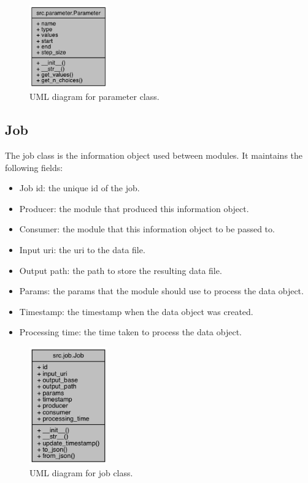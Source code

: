\documentclass{article}
\begin{document}
    \begin{figure}[H]
        \begin{center}
            \includegraphics[width=0.3\textwidth]{fig/param_uml.png}
        \end{center}
        \label{fig:param_uml}
        \caption{UML diagram for parameter class.}
    \end{figure}

    \subsection{Job}
    \label{sec:job}
    The job class is the information object used between modules.
    It maintains the following fields:

    \begin{itemize}
        \item Job id: the unique id of the job.
        \item Producer: the module that produced this information object.
        \item Consumer: the module that this information object to be passed to.
        \item Input uri: the uri to the data file.
        \item Output path: the path to store the resulting data file.
        \item Params: the params that the module should use to process the data object.
        \item Timestamp: the timestamp when the data object was created.
        \item Processing time: the time taken to process the data object.
    \end{itemize}


    \begin{figure}[H]
        \begin{center}
            \includegraphics[width=0.3\textwidth]{fig/job_uml.png}
        \end{center}
        \label{fig:job_uml}
        \caption{UML diagram for job class.}
    \end{figure}
\end{document}
